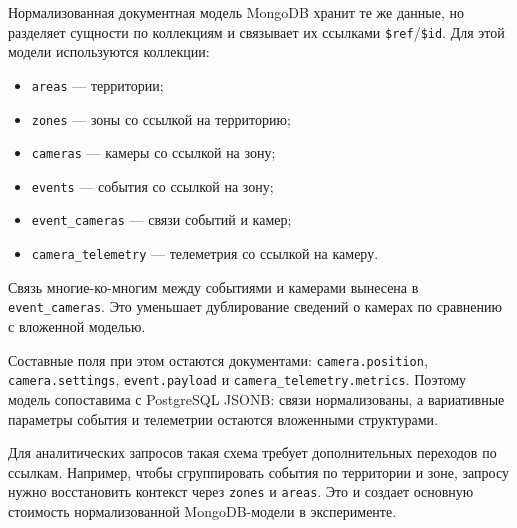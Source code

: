Нормализованная документная модель MongoDB хранит те же данные, но разделяет
сущности по коллекциям и связывает их ссылками \texttt{\$ref}/\texttt{\$id}.
Для этой модели используются коллекции:

\begin{itemize}
  \item \texttt{areas} --- территории;
  \item \texttt{zones} --- зоны со ссылкой на территорию;
  \item \texttt{cameras} --- камеры со ссылкой на зону;
  \item \texttt{events} --- события со ссылкой на зону;
  \item \texttt{event\_cameras} --- связи событий и камер;
  \item \texttt{camera\_telemetry} --- телеметрия со ссылкой на камеру.
\end{itemize}

Связь многие-ко-многим между событиями и камерами вынесена в
\texttt{event\_cameras}. Это уменьшает дублирование сведений о камерах по
сравнению с вложенной моделью.

Составные поля при этом остаются документами: \texttt{camera.position},
\texttt{camera.settings}, \texttt{event.payload} и
\texttt{camera\_telemetry.metrics}. Поэтому модель сопоставима с PostgreSQL
JSONB: связи нормализованы, а вариативные параметры события и телеметрии
остаются вложенными структурами.

Для аналитических запросов такая схема требует дополнительных переходов по
ссылкам. Например, чтобы сгруппировать события по территории и зоне, запросу
нужно восстановить контекст через \texttt{zones} и \texttt{areas}. Это и
создает основную стоимость нормализованной MongoDB-модели в эксперименте.
